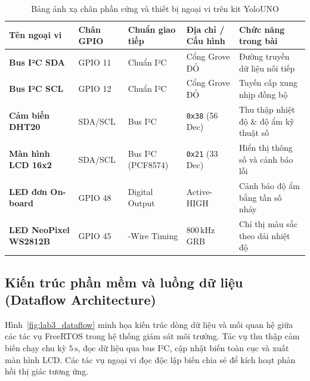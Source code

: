 \begin{table}[h!]
\centering
\small
\begin{tabularx}{\textwidth}{|>{\raggedright\arraybackslash}p{2.6cm}|>{\centering\arraybackslash}p{1.8cm}|>{\centering\arraybackslash}p{2.3cm}|>{\centering\arraybackslash}p{2.2cm}|>{\raggedright\arraybackslash}X|}
\hline
\textbf{Tên ngoại vi} & \textbf{Chân GPIO} & \textbf{Chuẩn giao tiếp} & \textbf{Địa chỉ / Cấu hình} & \textbf{Chức năng trong bài} \\
\hline
\textbf{Bus I²C SDA} & GPIO 11 & Chuẩn I²C & Cổng Grove ĐỎ & Đường truyền dữ liệu nối tiếp \\
\textbf{Bus I²C SCL} & GPIO 12 & Chuẩn I²C & Cổng Grove ĐỎ & Tuyến cấp xung nhịp đồng bộ \\
\textbf{Cảm biến DHT20} & SDA/SCL & Bus I²C & \texttt{0x38} (56 Dec) & Thu thập nhiệt độ \& độ ẩm kỹ thuật số \\
\textbf{Màn hình LCD 16x2} & SDA/SCL & Bus I²C (PCF8574) & \texttt{0x21} (33 Dec) & Hiển thị thông số và cảnh báo lỗi \\
\textbf{LED đơn On-board} & GPIO 48 & Digital Output & Active-HIGH & Cảnh báo độ ẩm bằng tần số nháy \\
\textbf{LED NeoPixel WS2812B} & GPIO 45 & 1-Wire Timing & $800\,\text{kHz}$ GRB & Chỉ thị màu sắc theo dải nhiệt độ \\
\hline
\end{tabularx}
\vspace{0.2cm}
\caption{Bảng ánh xạ chân phần cứng và thiết bị ngoại vi trên kit YoloUNO}
\label{tab:hardware_iot_lab3}
\end{table}

\subsection{Kiến trúc phần mềm và luồng dữ liệu (Dataflow Architecture)}
Hình~\ref{fig:lab3_dataflow} minh họa kiến trúc dòng dữ liệu và mối quan hệ giữa các tác vụ FreeRTOS trong hệ thống giám sát môi trường. Tác vụ thu thập cảm biến chạy chu kỳ $5\,\text{s}$, đọc dữ liệu qua bus I²C, cập nhật biến toàn cục và xuất màn hình LCD. Các tác vụ ngoại vi đọc độc lập biến chia sẻ để kích hoạt phản hồi thị giác tương ứng.

